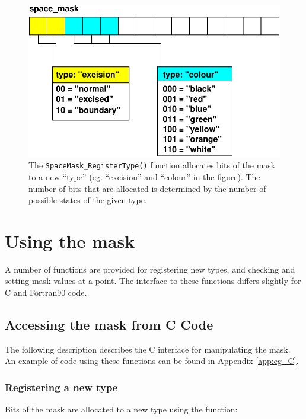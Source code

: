 \documentclass{article}
\begin{document}
\begin{figure}
  \centering
  \includegraphics{space_mask}
  \caption{The \texttt{SpaceMask\_RegisterType()} function allocates
  bits of the mask to a new ``type'' (eg. ``excision'' and ``colour''
  in the figure). The number of bits that are allocated is determined
  by the number of possible states of the given type.}
  \label{fig:mask_bits}
\end{figure}

\section{Using the mask}

A number of functions are provided for registering new types, and
checking and setting mask values at a point. The interface to these
functions differs slightly for C and Fortran90 code.

\subsection{Accessing the mask from C Code}

The following description describes the C interface for manipulating
the mask. An example of code using these functions can be found in
Appendix \ref{app:eg_C}.

\subsubsection{Registering a new type}\label{sec:reg_C}

Bits of the mask are allocated to a new type using the function:
\end{document}
